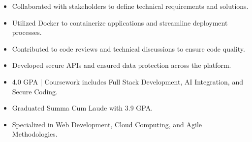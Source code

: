 \par\smallskip
\noindent
\begin{minipage}{20cm}
  \begin{minipage}{9.75cm}
    \begin{itemize}
      \item Collaborated with stakeholders to define technical requirements and solutions.
      \item Utilized Docker to containerize applications and streamline deployment processes.
    \end{itemize}
  \end{minipage}
  \hfill
  \begin{minipage}{9.75cm}
    \begin{itemize}
      \item Contributed to code reviews and technical discussions to ensure code quality.
      \item Developed secure APIs and ensured data protection across the platform.
    \end{itemize}
  \end{minipage}
\end{minipage}
\par\smallskip
\divider

\begin{itemize}
  \item 4.0 GPA | Coursework includes Full Stack Development, AI Integration, and Secure Coding.
\end{itemize}
\divider

\begin{itemize}
  \item Graduated Summa Cum Laude with 3.9 GPA.
  \item Specialized in Web Development, Cloud Computing, and Agile Methodologies.
\end{itemize}

\noindent
\begin{minipage}{20cm}
\end{minipage}


